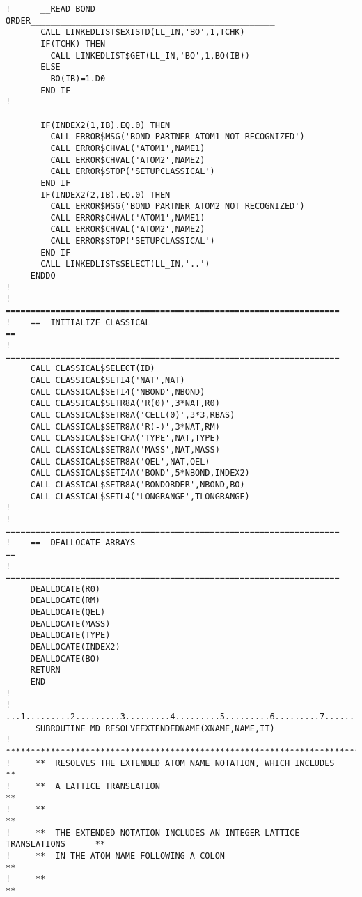 \documentclass[11pt,a4paper]{report}
\begin{document}
\begin{verbatim}
!      __READ BOND ORDER_________________________________________________
       CALL LINKEDLIST$EXISTD(LL_IN,'BO',1,TCHK)
       IF(TCHK) THEN
         CALL LINKEDLIST$GET(LL_IN,'BO',1,BO(IB))
       ELSE
         BO(IB)=1.D0
       END IF
!      _________________________________________________________________
       IF(INDEX2(1,IB).EQ.0) THEN
         CALL ERROR$MSG('BOND PARTNER ATOM1 NOT RECOGNIZED')
         CALL ERROR$CHVAL('ATOM1',NAME1)
         CALL ERROR$CHVAL('ATOM2',NAME2)
         CALL ERROR$STOP('SETUPCLASSICAL')
       END IF
       IF(INDEX2(2,IB).EQ.0) THEN
         CALL ERROR$MSG('BOND PARTNER ATOM2 NOT RECOGNIZED')
         CALL ERROR$CHVAL('ATOM1',NAME1)
         CALL ERROR$CHVAL('ATOM2',NAME2)
         CALL ERROR$STOP('SETUPCLASSICAL')
       END IF
       CALL LINKEDLIST$SELECT(LL_IN,'..')
     ENDDO
!
!    ===================================================================
!    ==  INITIALIZE CLASSICAL                                         ==
!    ===================================================================
     CALL CLASSICAL$SELECT(ID)
     CALL CLASSICAL$SETI4('NAT',NAT)
     CALL CLASSICAL$SETI4('NBOND',NBOND)
     CALL CLASSICAL$SETR8A('R(0)',3*NAT,R0)
     CALL CLASSICAL$SETR8A('CELL(0)',3*3,RBAS)
     CALL CLASSICAL$SETR8A('R(-)',3*NAT,RM)
     CALL CLASSICAL$SETCHA('TYPE',NAT,TYPE)
     CALL CLASSICAL$SETR8A('MASS',NAT,MASS)
     CALL CLASSICAL$SETR8A('QEL',NAT,QEL)
     CALL CLASSICAL$SETI4A('BOND',5*NBOND,INDEX2)
     CALL CLASSICAL$SETR8A('BONDORDER',NBOND,BO)
     CALL CLASSICAL$SETL4('LONGRANGE',TLONGRANGE)
!
!    ===================================================================
!    ==  DEALLOCATE ARRAYS                                            ==
!    ===================================================================
     DEALLOCATE(R0)
     DEALLOCATE(RM)
     DEALLOCATE(QEL)
     DEALLOCATE(MASS)
     DEALLOCATE(TYPE)
     DEALLOCATE(INDEX2)
     DEALLOCATE(BO)
     RETURN
     END
!
!     ...1.........2.........3.........4.........5.........6.........7.........8
      SUBROUTINE MD_RESOLVEEXTENDEDNAME(XNAME,NAME,IT)
!     **************************************************************************
!     **  RESOLVES THE EXTENDED ATOM NAME NOTATION, WHICH INCLUDES            **
!     **  A LATTICE TRANSLATION                                               **
!     **                                                                      **
!     **  THE EXTENDED NOTATION INCLUDES AN INTEGER LATTICE TRANSLATIONS      **
!     **  IN THE ATOM NAME FOLLOWING A COLON                                  **
!     **                                                                      **

\end{verbatim}
\end{document}
